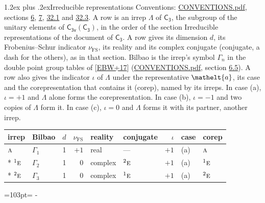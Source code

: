 \documentclass[10pt,a4paper]{article}
\makeatletter
\renewcommand\section{\@startsection{section}{1}{\z@}{-3ex plus -1ex minus -.2ex}%
  {1.2ex plus .2ex}{\normalfont\large\sffamily\bfseries\color{parttitle}}}
\newcommand{\needspace}[1]{\par\penalty-100\begingroup\dimen0=#1\relax\dimen2=\pagegoal
  \advance\dimen2-\pagetotal\ifdim\dimen0>\dimen2\relax\ifdim\dimen2>0pt\vfil\break\fi\fi
  \endgroup}
\numberwithin{equation}{section}
\newcommand{\eltfont}[1]{{\let\sigma\eltsigma\mathelt{#1}}}
\newcommand{\grp}[1]{\mathsf{#1}}
\newcommand{\irr}[1]{\text{\normalfont\scshape #1}}
\newcommand{\conjpair}[1]{{}^{#1}}
\newcommand{\elt}[1]{\eltfont{#1}}
\newcommand{\fsind}{\nu_{\mathrm{FS}}}
\makeatother
\begin{document}
\section{Irreducible representations}\label{s:irreps}
Conventions: \href{../../CONVENTIONS.pdf}{CONVENTIONS.pdf}, sections \href{../../../rotation/CONVENTIONS.pdf\#conv.6}{6}, \href{../../../rotation/CONVENTIONS.pdf\#conv.7}{7}, \href{../../CONVENTIONS.pdf\#conv.32.1}{32.1} and \href{../../CONVENTIONS.pdf\#conv.32.3}{32.3}.
\leavevmode\label{n:irrep.Delta}A row is an irrep $\Lambda$ of $\grp{C_{3}}$, the subgroup of the unitary elements of $\grp{C_{3v}}(\grp{C_{3}})$, in the order of the section Irreducible representations of the document of \href{../../../rotation/data/pdf/C3.pdf}{$\grp{C_{3}}$}. \label{n:index.dimension}\label{n:index.frobenius}\label{n:head.irrep}\label{n:head.reality}\label{n:head.conjugate}A row gives its dimension $d$, its Frobenius--Schur indicator $\fsind$, its reality and its complex conjugate (conjugate, a dash for the others), as in that section. \label{n:head.bilbao}\label{n:irrep.alias.gamma}Bilbao is the irrep's symbol $\Gamma_n$ in the double point group tables of [\href{../../../REFERENCES.pdf\#ref.EBW+17}{EBW+17}] (\href{../../CONVENTIONS.pdf}{CONVENTIONS.pdf}, section \href{../../../rotation/CONVENTIONS.pdf\#conv.6.5}{6.5}). \label{n:head.case.corep}\label{n:head.corep}A row also gives the indicator $\iota$ of $\Lambda$ under the representative $\elt{a}$, its case and the corepresentation that contains it (corep), named by its irreps. In case (a), $\iota = +1$ and $\Lambda$ alone forms the corepresentation. In case (b), $\iota = -1$ and two copies of $\Lambda$ form it. In case (c), $\iota = 0$ and $\Lambda$ forms it with its partner, another irrep.
\setlength{\emergencystretch}{2em}\par\setlength{\emergencystretch}{0pt}
{\small\renewcommand{\arraystretch}{1.25}\setlength{\tabcolsep}{4pt}\begin{longtable}{@{}llrrllrll@{}}\toprule
irrep & Bilbao & $d$ & $\fsind$ & reality & conjugate & $\iota$ & case & corep\\\midrule\endhead
\bottomrule\endfoot\endlastfoot
$\irr{a}$ & $\Gamma_{1}$ & 1 & $+1$ & real & --- & $+1$ & (a) & $\irr{a}$\\*
$\conjpair{1}\irr{e}$ & $\Gamma_{2}$ & 1 & $0$ & complex & $\conjpair{2}\irr{e}$ & $+1$ & (a) & $\conjpair{1}\irr{e}$\\*
$\conjpair{2}\irr{e}$ & $\Gamma_{3}$ & 1 & $0$ & complex & $\conjpair{1}\irr{e}$ & $+1$ & (a) & $\conjpair{2}\irr{e}$\\
\bottomrule\end{longtable}}
\needspace{103pt}
\end{document}
